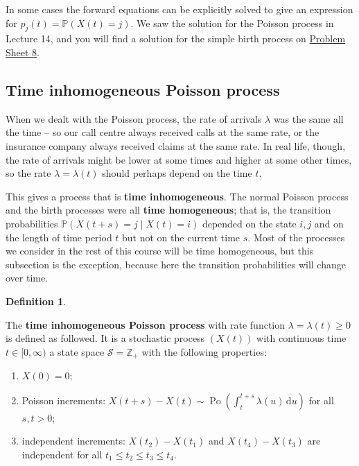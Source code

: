 \documentclass[
  a4paper,
]{article}
\providecommand{\tightlist}{%
  \setlength{\itemsep}{0pt}\setlength{\parskip}{0pt}}
\theoremstyle{definition}
\newtheorem{definition}{Definition}[section]
\theoremstyle{definition}
\theoremstyle{definition}
\theoremstyle{remark}
\begin{document}
In some cases the forward equations can be explicitly solved to give an expression for \(p_j(t) = \mathbb P(X(t) = j)\). We saw the solution for the Poisson process in Lecture 14, and you will find a solution for the simple birth process on \protect\hyperlink{P08}{Problem Sheet 8}.

\hypertarget{TIPP}{%
\subsection{Time inhomogeneous Poisson process}\label{TIPP}}

When we dealt with the Poisson process, the rate of arrivals \(\lambda\) was the same all the time -- so our call centre always received calls at the same rate, or the insurance company always received claims at the same rate. In real life, though, the rate of arrivals might be lower at some times and higher at some other times, so the rate \(\lambda = \lambda(t)\) should perhaps depend on the time \(t\).

This gives a process that is \textbf{time inhomogeneous}. The normal Poisson process and the birth processes were all \textbf{time homogeneous}; that is, the transition probabilities
\(\mathbb P(X(t+s) = j \mid X(t) = i)\) depended on the state \(i,j\) and on the length of time period \(t\) but not on the current time \(s\). Most of the processes we consider in the rest of this course will be time homogeneous, but this subsection is the exception, because here the transition probabilities will change over time.

\begin{definition}
\protect\hypertarget{def:TIPP-defn}{}\label{def:TIPP-defn}

The \textbf{time inhomogeneous Poisson process} with rate function \(\lambda = \lambda(t) \geq 0\) is defined as followed. It is a stochastic process \((X(t))\) with continuous time \(t \in [0,\infty)\) a state space \(\mathcal S = \mathbb Z_+\) with the following properties:

\begin{enumerate}
\def\labelenumi{\arabic{enumi}.}
\tightlist
\item
  \(X(0) = 0\);
\item
  Poisson increments: \(X(t+s) - X(t) \sim \operatorname{Po}(\int_t^{t+s} \lambda(u) \, \mathrm d u)\) for all \(s,t>0\);
\item
  independent increments: \(X(t_2) - X(t_1)\) and \(X(t_4) - X(t_3)\) are independent for all \(t_1 \leq t_2 \leq t_3 \leq t_4\).
\end{enumerate}

\end{definition}
\end{document}
